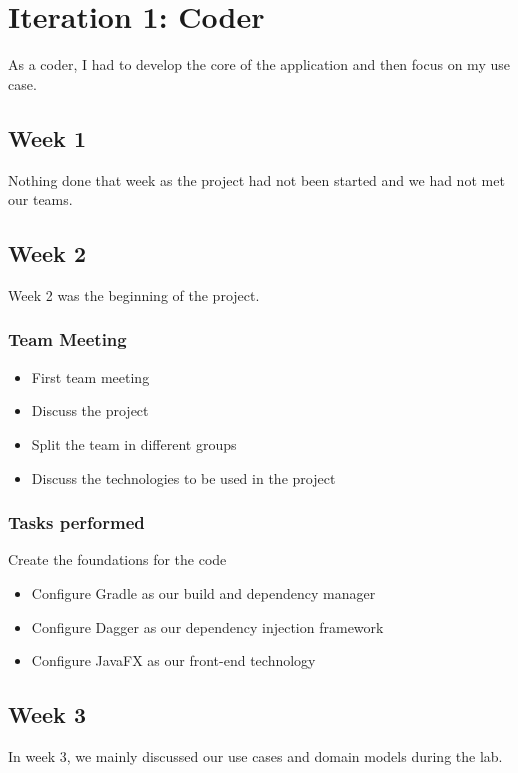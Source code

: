 \documentclass[12pt]{article}
\begin{document}
\maketitle

\section{Iteration 1: Coder}
As a coder, I had to develop the core of the application and then focus on my use case.

\subsection{Week 1}
Nothing done that week as the project had not been started and we had not met our teams.

\subsection{Week 2}
Week 2 was the beginning of the project.

\subsubsection{Team Meeting}
\begin{itemize}
    \item First team meeting
    \item Discuss the project
    \item Split the team in different groups
    \item Discuss the technologies to be used in the project
\end{itemize}

\subsubsection{Tasks performed}
\item Create the foundations for the code
\begin{itemize}
    \item Configure Gradle as our build and dependency manager
    \item Configure Dagger as our dependency injection framework
    \item Configure JavaFX as our front-end technology
\end{itemize}

\subsection{Week 3}
In week 3, we mainly discussed our use cases and domain models during the lab.
\end{document}
